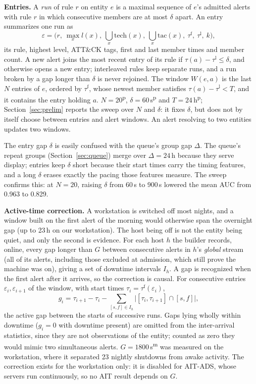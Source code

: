\documentclass[conference]{IEEEtran}
\newcommand{\prov}{\textsuperscript{\textcolor{orange!80!black}{p}}}   %
\newcommand{\meas}{\textsuperscript{\textcolor{green!45!black}{m}}}    %
\begin{document}
\textbf{Entries.} A \emph{run} of rule $r$ on entity $e$ is a maximal sequence of $e$'s admitted alerts with rule $r$ in which consecutive members are at most $\delta$ apart. An entry summarizes one run as
\begin{equation}
\varepsilon = \big(r,\ \max_{x} l(x),\ \textstyle\bigcup_x \mathrm{tech}(x),\ \bigcup_x \mathrm{tac}(x),\ \tau^{\mathrm{f}},\ \tau^{\mathrm{l}},\ k\big),
\end{equation}
its rule, highest level, ATT\&CK tags, first and last member times and member count. A new alert joins the most recent entry of its rule if $\tau(a) - \tau^{\mathrm{l}} \le \delta$, and otherwise opens a new entry; interleaved rules keep separate runs, and a run broken by a gap longer than $\delta$ is never rejoined. The window $W(e,a)$ is the last $N$ entries of $e$, ordered by $\tau^{\mathrm{f}}$, whose newest member satisfies $\tau(a) - \tau^{\mathrm{l}} < T$, and it contains the entry holding $a$. $N = 20$\prov{}, $\delta = 60$\,s\prov{} and $T = 24$\,h\prov{}; Section~\ref{sec:prelim} reports the sweep over $N$ and $\delta$: it fixes $\delta$, but does not by itself choose between entries and alert windows. An alert resolving to two entities updates two windows.

The entry gap $\delta$ is easily confused with the queue's group gap $\Delta$. The queue's repeat groups (Section~\ref{sec:queue}) merge over $\Delta = 24$\,h because they serve display; entries keep $\delta$ short because their start times carry the timing features, and a long $\delta$ erases exactly the pacing those features measure. The sweep confirms this: at $N = 20$, raising $\delta$ from 60\,s to 900\,s lowered the mean AUC from 0.963 to 0.829.

\textbf{Active-time correction.} A workstation is switched off most nights, and a window built on the first alert of the morning would otherwise span the overnight gap (up to 23\,h on our workstation). The host being off is not the entity being quiet, and only the second is evidence. For each host $h$ the builder records, online, every gap longer than $G$ between consecutive alerts in $h$'s \emph{global} stream (all of its alerts, including those excluded at admission, which still prove the machine was on), giving a set of downtime intervals $I_h$. A gap is recognized when the first alert after it arrives, so the correction is causal. For consecutive entries $\varepsilon_i, \varepsilon_{i+1}$ of the window, with start times $\tau_i = \tau^{\mathrm{f}}(\varepsilon_i)$,
\begin{equation}
g_i = \tau_{i+1} - \tau_i - \sum_{[s,f] \in I_h} \big| [\tau_i, \tau_{i+1}] \cap [s,f] \big| ,
\end{equation}
the active gap between the starts of successive runs. Gaps lying wholly within downtime ($g_i = 0$ with downtime present) are omitted from the inter-arrival statistics, since they are not observations of the entity; counted as zero they would mimic two simultaneous alerts. $G = 1800$\,s\meas{} was measured on the workstation, where it separated 23 nightly shutdowns from awake activity. The correction exists for the workstation only: it is disabled for AIT-ADS, whose servers run continuously, so no AIT result depends on $G$.
\end{document}
